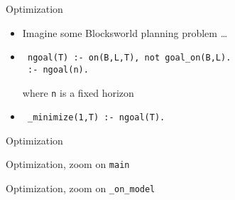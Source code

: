 \begin{frame}[fragile]{Optimization}
  \bigskip
  \begin{itemize}
  \item Imagine some Blocksworld planning problem \dots
    \smallskip
  \item {}
\begin{lstlisting}
 ngoal(T) :- on(B,L,T), not goal_on(B,L).
 :- ngoal(n).
\end{lstlisting}
    where \texttt{n} is a fixed horizon
    \medskip
  \item<2-> 
\begin{lstlisting}
 _minimize(1,T) :- ngoal(T).
\end{lstlisting}
  \end{itemize}
\end{frame}
\begin{frame}{Optimization}
  
\end{frame}
\begin{frame}[fragile,shrink=37]{Optimization, zoom on \texttt{main}}
  \bigskip
  
\end{frame}
\begin{frame}[fragile,shrink=25]{Optimization, zoom on \texttt{\_on\_model}}
  \bigskip
  
\end{frame}
%
